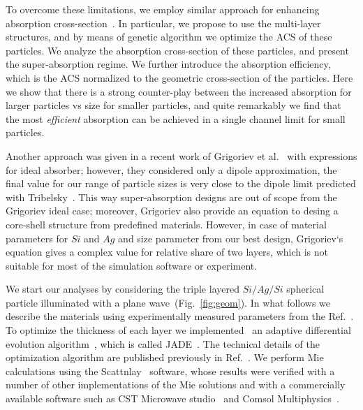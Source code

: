 \documentclass[aps,prl,twocolumn,showpacs,superscriptaddress,groupedaddress]{revtex4-1}
\begin{document}
To overcome these limitations, we employ similar approach for
enhancing absorption cross-section~\cite{Fan-2011}. In particular, we
propose to use the multi-layer structures, and by means of genetic
algorithm we optimize the ACS of these particles. We analyze the
absorption cross-section of these particles, and present the
super-absorption regime. We further introduce the absorption
efficiency, which is the ACS normalized to the geometric cross-section
of the particles. Here we show that there is a strong counter-play
between the increased absorption for larger particles vs size for
smaller particles, and quite remarkably we find that the most {\em
  efficient} absorption can be achieved in a single channel limit for
small particles.

Another approach was given in a recent work of Grigoriev et
al.~\cite{Grigoriev-2015} with expressions for ideal absorber;
however, they considered only a dipole approximation, the final value
for our range of particle sizes is very close to the dipole limit
predicted with Tribelsky~\cite{Tribelsky-2011}.  This way
super-absorption designs are out of scope from the Grigoriev ideal
case; moreover, Grigoriev also provide an equation to desing a
core-shell structure from predefined materials. However, in case of
material parameters for $Si$ and $Ag$ and size parameter
from our best design, Grigoriev`s equation gives a complex value for
relative share of two layers, which is not suitable for most of the
simulation software or experiment.


\begin{figure}
\end{figure}


We start our analyses by considering the triple layered $Si/Ag/Si$
spherical particle illuminated with a plane wave~(Fig.~\ref{fig:geom}). In what
follows we describe the materials using experimentally measured
parameters from the Ref.~\cite{palik-1997}.  To optimize the thickness of each
layer we implemented~\cite{JADE-web} an adaptive differential
evolution algorithm~\cite{Storn-DE-first-1997}, which is called
JADE~\cite{Jingqiao-JADE-2009}.  The technical details of the
optimization algorithm are published previously in
Ref.~\cite{Ladutenko-2014}. We perform Mie calculations using the
Scattnlay~\cite{Pena-scattnlay-2009,Scattnlay-web} software, whose results were
verified with a number of other implementations of the Mie solutions
and with a commercially available software such as CST Microwave
studio~\cite{CST-web} and Comsol Multiphysics~\cite{Comsol-web}.
\end{document}
